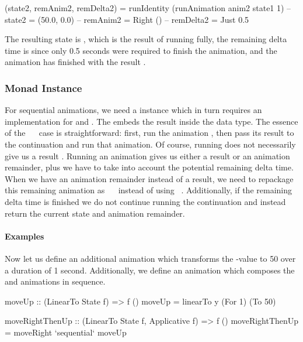 \begin{code}
(state2, remAnim2, remDelta2) =
  runIdentity (runAnimation anim2 state1 1)
-- state2 = (50.0, 0.0)
-- remAnim2 = Right ()
-- remDelta2 = Just 0.5
\end{code}

The resulting state is , which is the result of running  fully, the remaining delta time is  since only 0.5 seconds were required to finish the animation, and the animation has finished with the result \hs{()}.

\subsubsection{Monad Instance}

For sequential animations, we need a  instance which in turn requires an implementation for  and \hs{>>=}. The  embeds the result  inside the  data type. The essence of the ~\hs{>>=}~ case is straightforward: first, run the animation , then pass its result to the continuation  and run that animation. Of course, running  does not necessarily give us a result . Running an animation gives us either a result or an animation remainder, plus we have to take into account the potential remaining delta time. When we have an animation remainder instead of a result, we need to repackage this remaining animation as ~\hs{>>=}~ instead of using ~. Additionally, if the remaining delta time is finished we do not continue running the continuation and instead return the current state and animation remainder.

\paragraph{Examples}

Now let us define an additional animation  which transforms the -value to 50 over a duration of 1 second. Additionally, we define an animation  which composes the  and  animations in sequence.

\begin{code}
moveUp :: (LinearTo State f) => f ()
moveUp = linearTo y (For 1) (To 50)

moveRightThenUp :: (LinearTo State f, Applicative f) => f ()
moveRightThenUp = moveRight `sequential` moveUp
\end{code}

